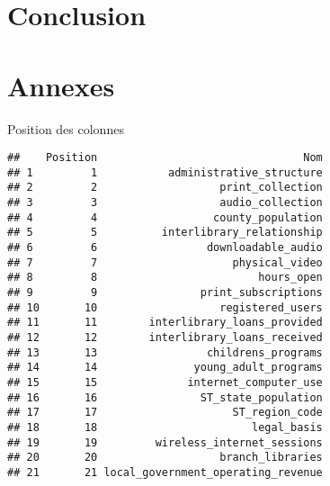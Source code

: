 \documentclass[14pt,]{article}
\begin{document}
\hypertarget{conclusion}{%
\section{Conclusion}\label{conclusion}}

\hypertarget{annexes}{%
\section{Annexes}\label{annexes}}

Position des colonnes

\begin{verbatim}
##    Position                                Nom
## 1         1           administrative_structure
## 2         2                   print_collection
## 3         3                   audio_collection
## 4         4                  county_population
## 5         5          interlibrary_relationship
## 6         6                 downloadable_audio
## 7         7                     physical_video
## 8         8                         hours_open
## 9         9                print_subscriptions
## 10       10                   registered_users
## 11       11        interlibrary_loans_provided
## 12       12        interlibrary_loans_received
## 13       13                 childrens_programs
## 14       14               young_adult_programs
## 15       15              internet_computer_use
## 16       16                ST_state_population
## 17       17                     ST_region_code
## 18       18                        legal_basis
## 19       19         wireless_internet_sessions
## 20       20                   branch_libraries
## 21       21 local_government_operating_revenue
\end{verbatim}
\end{document}
